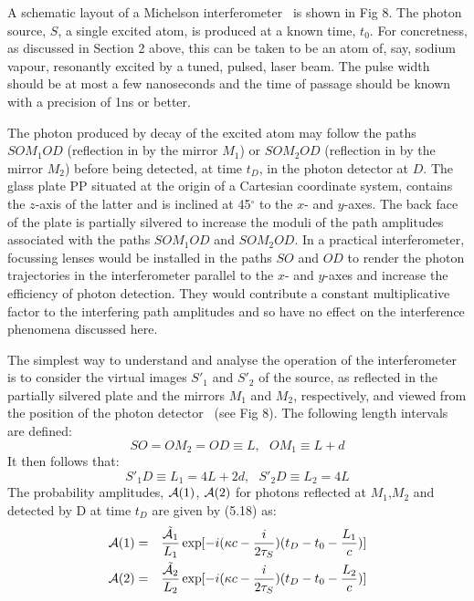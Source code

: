 \documentclass [12pt]{article}
\begin{document}
{  \par A schematic layout of a Michelson interferometer~\cite{JW1} is shown in Fig 8.
    The photon source, $S$,
   a single excited atom, is produced at a known time, $t_0$. For concretness, as discussed in Section 2 above, this can be
  taken to be an atom of, say, sodium vapour, resonantly excited by a tuned, pulsed, laser beam.
   The pulse width should be at most a few nanoseconds and the time of passage should be known with a precision
  of 1ns or better.
  \par The photon produced by decay of the excited atom may follow the paths $SOM_1OD$ (reflection in by the
    mirror $M_1$) or $SOM_2OD$ (reflection in by the mirror $M_2$) before being detected, at time $t_D$, in the 
   photon detector at $D$. The glass plate PP situated at the origin of a Cartesian coordinate system,
   contains the $z$-axis of the latter and is inclined at 45$^{\circ}$ to the $x$- and $y$-axes. The back face
   of the plate is partially silvered to increase the moduli of the path amplitudes associated with
   the paths  $SOM_1OD$ and  $SOM_2OD$. In a practical interferometer, focussing lenses would be installed in
    the paths $SO$ and $OD$ to render the photon trajectories in the interferometer parallel to the $x$- and
    $y$-axes and increase the efficiency of photon detection. They would contribute a constant multiplicative
    factor to the interfering path amplitudes and so have no effect on the interference phenomena 
    discussed here. 
    \par The simplest way to understand and analyse the operation of the interferometer is to consider the virtual
   images $S'_1$ and $S'_2$ of the source, as reflected in the partially silvered plate and the mirrors
    $M_1$ and $M_2$, respectively, and viewed from the position of the photon detector~\cite{JW1} (see Fig 8).
    The following length intervals are defined:
    \[ SO = OM_2 = OD \equiv L,~~~OM_1 \equiv L+d  \]
    It then follows that:
    \[ S'_1D \equiv L_1 = 4L+2d,~~~S'_2D \equiv L_2 = 4L \]
     The probability amplitudes, ${\cal A}(1)$, ${\cal A}(2)$ for photons reflected at $M_1$,$M_2$ and detected 
     by D at time $t_D$ are given by (5.18) as:
     \begin{eqnarray}
   {\cal A}(1) & = & \frac{\tilde{{\cal A}_1}}{L_1} \exp[-i(\kappa c- \frac{i}{2 \tau_S})(t_D-t_0-\frac{L_1}{c})] \\
  {\cal A}(2) & = & \frac{\tilde{{\cal A}_2}}{L_2} \exp[-i(\kappa c- \frac{i}{2 \tau_S})(t_D-t_0-\frac{L_2}{c})]
    \end{eqnarray}
}
\end{document}
